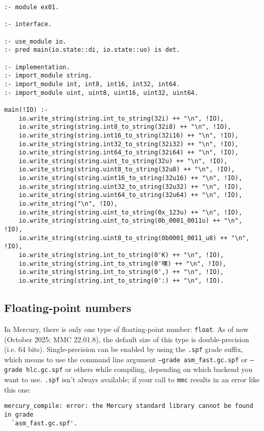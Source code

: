 \begin{lstlisting}[language=Mercury]
:- module ex01.

:- interface.

:- use_module io.
:- pred main(io.state::di, io.state::uo) is det.

:- implementation.
:- import_module string.
:- import_module int, int8, int16, int32, int64.
:- import_module uint, uint8, uint16, uint32, uint64.

main(!IO) :-
	io.write_string(string.int_to_string(32i) ++ "\n", !IO),
	io.write_string(string.int8_to_string(32i8) ++ "\n", !IO),
	io.write_string(string.int16_to_string(32i16) ++ "\n", !IO),
	io.write_string(string.int32_to_string(32i32) ++ "\n", !IO),
	io.write_string(string.int64_to_string(32i64) ++ "\n", !IO),
	io.write_string(string.uint_to_string(32u) ++ "\n", !IO),
	io.write_string(string.uint8_to_string(32u8) ++ "\n", !IO),
	io.write_string(string.uint16_to_string(32u16) ++ "\n", !IO),
	io.write_string(string.uint32_to_string(32u32) ++ "\n", !IO),
	io.write_string(string.uint64_to_string(32u64) ++ "\n", !IO),
	io.write_string("\n", !IO),
	io.write_string(string.uint_to_string(0x_123u) ++ "\n", !IO),
	io.write_string(string.uint_to_string(0b_0001_0011u) ++ "\n", !IO),
	io.write_string(string.uint8_to_string(0b0001_0011_u8) ++ "\n", !IO),
	io.write_string(string.int_to_string(0'K) ++ "\n", !IO),
	io.write_string(string.int_to_string(0'嘿) ++ "\n", !IO),
	io.write_string(string.int_to_string(0',) ++ "\n", !IO),
	io.write_string(string.int_to_string(0':) ++ "\n", !IO).
\end{lstlisting}

\subsection{Floating-point numbers}

In Mercury, there is only one type of floating-point number: \texttt{float}. As of now (October 2025; MMC 22.01.8), the default size of this type is double-precision (i.e. 64 bits). Single-precision can be enabled by using the \texttt{.spf} grade suffix, which means to use the command line argument \texttt{--grade asm\_fast.gc.spf} or \texttt{--grade hlc.gc.spf} or others while compiling, depending on which backend you want to use. \texttt{.spf} isn't always available; if your call to \texttt{mmc} results in an error like this one:

\begin{lstlisting}
mercury_compile: error: the Mercury standard library cannot be found in grade
  `asm_fast.gc.spf'.
\end{lstlisting}

